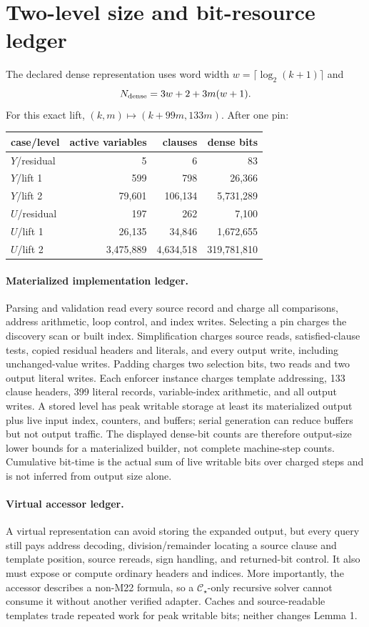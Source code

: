\documentclass[11pt]{article}
\newcommand{\CS}{\mathcal C_\star}
\begin{document}
\section{Two-level size and bit-resource ledger}
The declared dense representation uses word width
$w=\lceil\log_2(k+1)\rceil$ and
\[
 N_{\rm dense}=3w+2+3m(w+1).
\]
For this exact lift, $(k,m)\mapsto(k+99m,133m)$.  After one pin:
\begin{center}
\begin{tabular}{lrrr}
\toprule
case/level & active variables & clauses & dense bits\\
\midrule
$Y$/residual & 5 & 6 & 83\\
$Y$/lift 1 & 599 & 798 & 26,366\\
$Y$/lift 2 & 79,601 & 106,134 & 5,731,289\\
$U$/residual & 197 & 262 & 7,100\\
$U$/lift 1 & 26,135 & 34,846 & 1,672,655\\
$U$/lift 2 & 3,475,889 & 4,634,518 & 319,781,810\\
\bottomrule
\end{tabular}
\end{center}

\paragraph{Materialized implementation ledger.}
Parsing and validation read every source record and charge all comparisons,
address arithmetic, loop control, and index writes.  Selecting a pin charges
the discovery scan or built index.  Simplification charges source reads,
satisfied-clause tests, copied residual headers and literals, and every output
write, including unchanged-value writes.  Padding charges two selection bits,
two reads and two output literal writes.  Each enforcer instance charges
template addressing, 133 clause headers, 399 literal records, variable-index
arithmetic, and all output writes.  A stored level has peak writable storage at
least its materialized output plus live input index, counters, and buffers;
serial generation can reduce buffers but not output traffic.  The displayed
dense-bit counts are therefore output-size lower bounds for a materialized
builder, not complete machine-step counts.  Cumulative bit-time is the actual
sum of live writable bits over charged steps and is not inferred from output
size alone.

\paragraph{Virtual accessor ledger.}
A virtual representation can avoid storing the expanded output, but every
query still pays address decoding, division/remainder locating a source clause
and template position, source rereads, sign handling, and returned-bit control.
It also must expose or compute ordinary headers and indices.  More importantly,
the accessor describes a non-M22 formula, so a $\CS$-only recursive solver
cannot consume it without another verified adapter.  Caches and source-readable
templates trade repeated work for peak writable bits; neither changes Lemma 1.
\end{document}
